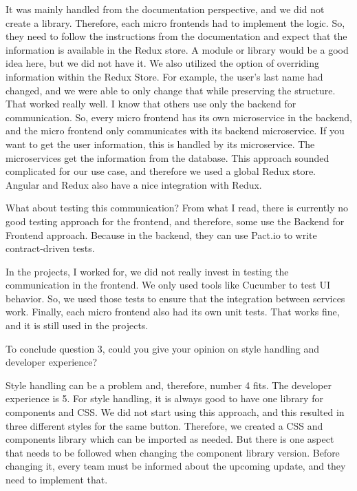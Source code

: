 \begin{description}
    \IvanJovanovic It was mainly handled from the documentation perspective, and we did not create a library. Therefore, each micro frontends had to implement the logic. So, they need to follow the instructions from the documentation and expect that the information is available in the Redux store. A module or library would be a good idea here, but we did not have it. We also utilized the option of overriding information within the Redux Store. For example, the user's last name had changed, and we were able to only change that while preserving the structure. That worked really well.
    I know that others use only the backend for communication. So, every micro frontend has its own microservice in the backend, and the micro frontend only communicates with its backend microservice. If you want to get the user information, this is handled by its microservice. The microservices get the information from the database. This approach sounded complicated for our use case, and therefore we used a global Redux store. Angular and Redux also have a nice integration with Redux.

    \NicoVogel What about testing this communication? From what I read, there is currently no good testing approach for the frontend, and therefore, some use the Backend for Frontend approach. Because in the backend, they can use Pact.io to write contract-driven tests.

    \IvanJovanovic In the projects, I worked for, we did not really invest in testing the communication in the frontend. We only used tools like Cucumber to test UI behavior. So, we used those tests to ensure that the integration between services work. Finally, each micro frontend also had its own unit tests. That works fine, and it is still used in the projects.

    \NicoVogel To conclude question 3, could you give your opinion on style handling and developer experience?

    \IvanJovanovic Style handling can be a problem and, therefore, number 4 fits. The developer experience is 5. For style handling, it is always good to have one library for components and CSS. We did not start using this approach, and this resulted in three different styles for the same button. Therefore, we created a CSS and components library which can be imported as needed. But there is one aspect that needs to be followed when changing the component library version. Before changing it, every team must be informed about the upcoming update, and they need to implement that.


\end{description}
